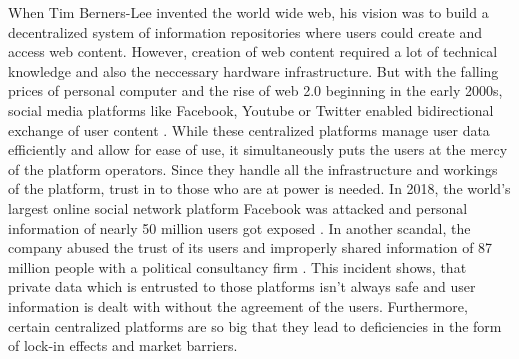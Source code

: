 When Tim Berners-Lee invented the world wide web, his vision was to build a decentralized system of information repositories where users could create and access web content. However, creation of web content required a lot of technical knowledge and also the neccessary hardware infrastructure. But with the falling prices of personal computer and the rise of web 2.0 beginning in the early 2000s, social media platforms like Facebook, Youtube or Twitter enabled bidirectional exchange of user content \cite{oreillyWhatWebDesign2007}. 
While these centralized platforms manage user data efficiently and allow for ease of use, it simultaneously puts the users at the mercy of the platform operators. Since they handle all the infrastructure and workings of the platform, trust in to those who are at power is needed. In 2018, the world's largest online social network platform Facebook was attacked and personal information of nearly 50 million users got exposed \cite{isaacFacebookSecurityBreach2018}. In another scandal, the company abused the trust of its users and improperly shared information of 87 million people with a political consultancy firm \cite{FacebookBrokeCanadaa}. This incident shows, that private data which is entrusted to those platforms isn't always safe and user information is dealt with without the agreement of the users. Furthermore, certain centralized platforms are so big that they lead to deficiencies in the form of lock-in effects and market barriers. \cite{einavPeerToPeerMarkets2016}
    

